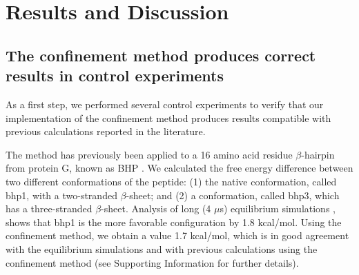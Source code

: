 \documentclass[12pt]{article}
\begin{document}



\section{Results and Discussion}

\subsection{The confinement method produces correct results in control experiments}

As a first step, we performed several control experiments to verify that our implementation of the
confinement method produces results compatible with previous calculations reported in the
literature.

The method has previously been applied to a 16 amino acid residue $\beta$-hairpin from
protein G, known as BHP \cite{Cecchini2009}. We calculated the free energy difference between two different
conformations of the peptide: (1) the native conformation, called bhp1, with a two-stranded
$\beta$-sheet; and (2) a conformation, called bhp3, which has a three-stranded $\beta$-sheet.
Analysis of long (4 $\mu$s) equilibrium simulations \cite{Cecchini2009},\cite{Krivov2004}  shows that bhp1 is the more favorable
configuration by 1.8 kcal/mol. Using the confinement method, we obtain a value 1.7 kcal/mol, which
is in good agreement with the equilibrium simulations and with previous calculations using the
confinement method \cite{Cecchini2009} (see Supporting Information for further details).
\end{document}
